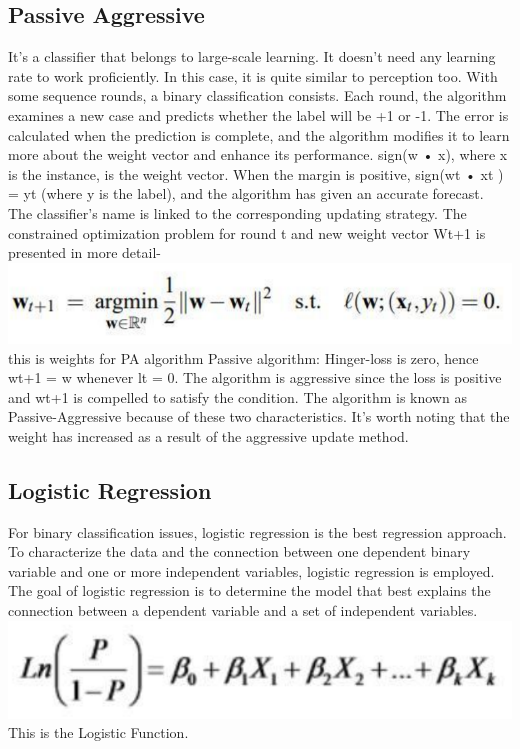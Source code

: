 \documentclass[conference]{IEEEtran}
\begin{document}
\subsection{Passive Aggressive}
It’s a classifier that belongs to large-scale learning.  It doesn’t need any learning rate to work proficiently. In this case, it is quite similar to perception too. With some sequence rounds, a binary classification consists. Each round, the algorithm examines a new case and predicts whether the label will be +1 or -1. The error is calculated when the prediction is complete, and the algorithm modifies it to learn more about the weight vector and enhance its performance.
sign(w • x), where x is the instance, is the weight vector. When the margin is positive, sign(wt • xt ) = yt (where y is the label), and the algorithm has given an accurate forecast. The classifier's name is linked to the corresponding updating strategy. The constrained optimization problem for round t and new weight vector Wt+1 is presented in more detail-
\includegraphics[scale=0.45]{figD.png}
this is weights for PA algorithm
Passive algorithm: Hinger-loss is zero, hence wt+1 = w whenever lt = 0.
The algorithm is aggressive since the loss is positive and wt+1 is compelled to satisfy the condition.
The algorithm is known as Passive-Aggressive because of these two characteristics. It's worth noting that the weight has increased as a result of the aggressive update method.


\subsection{Logistic Regression}
For binary classification issues, logistic regression is the best regression approach. To characterize the data and the connection between one dependent binary variable and one or more independent variables, logistic regression is employed. The goal of logistic regression is to determine the model that best explains the connection between a dependent variable and a set of independent variables.
\includegraphics[scale=0.45]{figE.png}
This is the Logistic Function.
\end{document}
